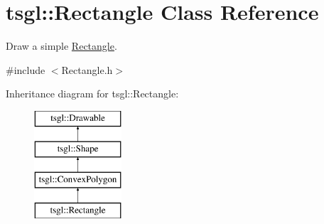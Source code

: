 \hypertarget{classtsgl_1_1_rectangle}{}\section{tsgl\+:\+:Rectangle Class Reference}
\label{classtsgl_1_1_rectangle}


Draw a simple \hyperlink{classtsgl_1_1_rectangle}{Rectangle}.  




{\ttfamily \#include $<$Rectangle.\+h$>$}

Inheritance diagram for tsgl\+:\+:Rectangle\+:\begin{figure}[H]
\begin{center}
\leavevmode
\includegraphics[height=4.000000cm]{classtsgl_1_1_rectangle}
\end{center}
\end{figure}
